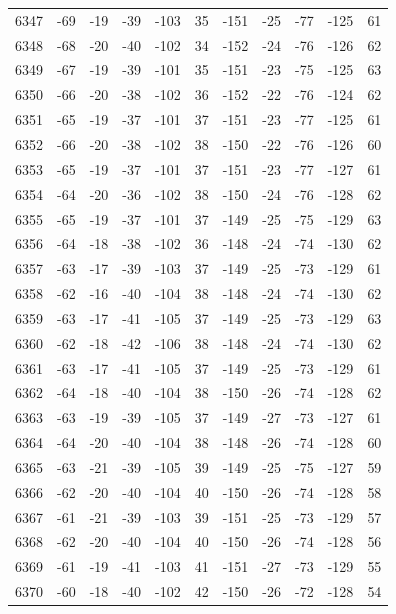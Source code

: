 \begin{table}[H]
\begin{tabular}{lllllllllll}
6347 & -69 & -19 & -39 & -103 & 35 & -151 & -25 & -77 & -125 & 61 \\
6348 & -68 & -20 & -40 & -102 & 34 & -152 & -24 & -76 & -126 & 62 \\
6349 & -67 & -19 & -39 & -101 & 35 & -151 & -23 & -75 & -125 & 63 \\
6350 & -66 & -20 & -38 & -102 & 36 & -152 & -22 & -76 & -124 & 62 \\
6351 & -65 & -19 & -37 & -101 & 37 & -151 & -23 & -77 & -125 & 61 \\
6352 & -66 & -20 & -38 & -102 & 38 & -150 & -22 & -76 & -126 & 60 \\
6353 & -65 & -19 & -37 & -101 & 37 & -151 & -23 & -77 & -127 & 61 \\
6354 & -64 & -20 & -36 & -102 & 38 & -150 & -24 & -76 & -128 & 62 \\
6355 & -65 & -19 & -37 & -101 & 37 & -149 & -25 & -75 & -129 & 63 \\
6356 & -64 & -18 & -38 & -102 & 36 & -148 & -24 & -74 & -130 & 62 \\
6357 & -63 & -17 & -39 & -103 & 37 & -149 & -25 & -73 & -129 & 61 \\
6358 & -62 & -16 & -40 & -104 & 38 & -148 & -24 & -74 & -130 & 62 \\
6359 & -63 & -17 & -41 & -105 & 37 & -149 & -25 & -73 & -129 & 63 \\
6360 & -62 & -18 & -42 & -106 & 38 & -148 & -24 & -74 & -130 & 62 \\
6361 & -63 & -17 & -41 & -105 & 37 & -149 & -25 & -73 & -129 & 61 \\
6362 & -64 & -18 & -40 & -104 & 38 & -150 & -26 & -74 & -128 & 62 \\
6363 & -63 & -19 & -39 & -105 & 37 & -149 & -27 & -73 & -127 & 61 \\
6364 & -64 & -20 & -40 & -104 & 38 & -148 & -26 & -74 & -128 & 60 \\
6365 & -63 & -21 & -39 & -105 & 39 & -149 & -25 & -75 & -127 & 59 \\
6366 & -62 & -20 & -40 & -104 & 40 & -150 & -26 & -74 & -128 & 58 \\
6367 & -61 & -21 & -39 & -103 & 39 & -151 & -25 & -73 & -129 & 57 \\
6368 & -62 & -20 & -40 & -104 & 40 & -150 & -26 & -74 & -128 & 56 \\
6369 & -61 & -19 & -41 & -103 & 41 & -151 & -27 & -73 & -129 & 55 \\
6370 & -60 & -18 & -40 & -102 & 42 & -150 & -26 & -72 & -128 & 54 \\

\end{tabular}
\end{table}
